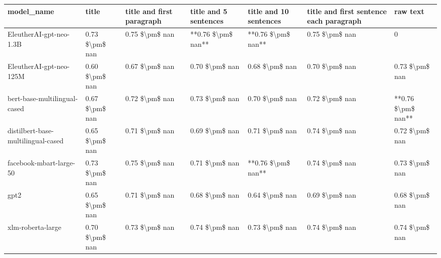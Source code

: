 \begin{tabular}{lllllll}
\toprule
                        model\_name &          title & title and first paragraph & title and 5 sentences & title and 10 sentences & title and first sentence each paragraph &           raw text \\
\midrule
           EleutherAI-gpt-neo-1.3B & 0.73 \$\textbackslash pm\$ nan &            0.75 \$\textbackslash pm\$ nan &    **0.76 \$\textbackslash pm\$ nan** &     **0.76 \$\textbackslash pm\$ nan** &                          0.75 \$\textbackslash pm\$ nan &                  0 \\
           EleutherAI-gpt-neo-125M & 0.60 \$\textbackslash pm\$ nan &            0.67 \$\textbackslash pm\$ nan &        0.70 \$\textbackslash pm\$ nan &         0.68 \$\textbackslash pm\$ nan &                          0.70 \$\textbackslash pm\$ nan &     0.73 \$\textbackslash pm\$ nan \\
      bert-base-multilingual-cased & 0.67 \$\textbackslash pm\$ nan &            0.72 \$\textbackslash pm\$ nan &        0.73 \$\textbackslash pm\$ nan &         0.70 \$\textbackslash pm\$ nan &                          0.72 \$\textbackslash pm\$ nan & **0.76 \$\textbackslash pm\$ nan** \\
distilbert-base-multilingual-cased & 0.65 \$\textbackslash pm\$ nan &            0.71 \$\textbackslash pm\$ nan &        0.69 \$\textbackslash pm\$ nan &         0.71 \$\textbackslash pm\$ nan &                          0.74 \$\textbackslash pm\$ nan &     0.72 \$\textbackslash pm\$ nan \\
           facebook-mbart-large-50 & 0.73 \$\textbackslash pm\$ nan &            0.75 \$\textbackslash pm\$ nan &        0.71 \$\textbackslash pm\$ nan &     **0.76 \$\textbackslash pm\$ nan** &                          0.74 \$\textbackslash pm\$ nan &     0.73 \$\textbackslash pm\$ nan \\
                              gpt2 & 0.65 \$\textbackslash pm\$ nan &            0.71 \$\textbackslash pm\$ nan &        0.68 \$\textbackslash pm\$ nan &         0.64 \$\textbackslash pm\$ nan &                          0.69 \$\textbackslash pm\$ nan &     0.68 \$\textbackslash pm\$ nan \\
                 xlm-roberta-large & 0.70 \$\textbackslash pm\$ nan &            0.73 \$\textbackslash pm\$ nan &        0.74 \$\textbackslash pm\$ nan &         0.73 \$\textbackslash pm\$ nan &                          0.74 \$\textbackslash pm\$ nan &     0.74 \$\textbackslash pm\$ nan \\
\bottomrule
\end{tabular}
